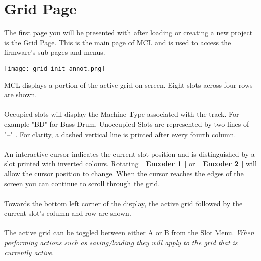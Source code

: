 
\chapter{Grid Page}
The first page you will be presented with after loading or creating a new project is the Grid Page. This is the main page of MCL and is used to access the firmware's sub-pages and menus.

\begin{center}
	\texttt{[image: grid\_init\_annot.png]}
\end{center}
MCL displays a portion of the active grid on screen. 
Eight slots across four rows are shown.\\
\\
Occupied slots will display the Machine Type associated with the track. For example "BD" for Bass Drum. Unoccupied Slots are represented by two lines of "--" . For clarity, a dashed vertical line is printed after every fourth column.\\\\
An interactive cursor indicates the current slot position and is distinguished by a slot printed with inverted colours. Rotating \textbf{[ Encoder 1 ]} or \textbf{[ Encoder 2 ]} will allow the cursor position to change. When the cursor reaches the edges of the screen you can continue to scroll through the grid.
\\\\
Towards the bottom left corner of the display, the active grid followed by the current slot's column and row are shown.\\\\
The active grid can be toggled between either A or B from the Slot Menu.
\textit{When performing actions such as saving/loading they will apply to the grid that is currently active.}
